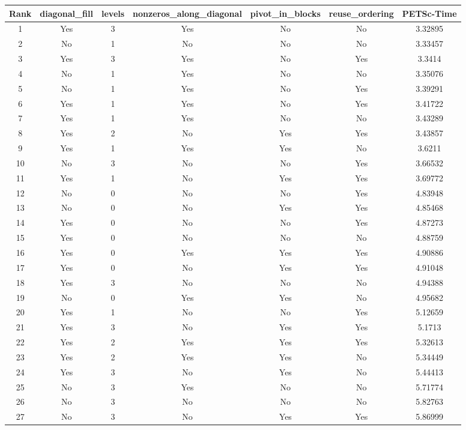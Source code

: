 \begin{table}[h]
  \tiny
  \centering
  \begin{tabular}{ccccccc}
    \hline Rank &  diagonal\_fill & levels & nonzeros\_along\_diagonal & pivot\_in\_blocks & reuse\_ordering  & PETSc-Time\\ \hline
    1 & Yes & 3 & Yes & No & No & 3.32895 \\
    2 & No & 1 & No & No & No & 3.33457 \\
    3 & Yes & 3 & Yes & No & Yes & 3.3414 \\
    4 & No & 1 & Yes & No & No & 3.35076 \\
    5 & No & 1 & Yes & No & Yes & 3.39291 \\
    6 & Yes & 1 & Yes & No & Yes & 3.41722 \\
    7 & Yes & 1 & Yes & No & No & 3.43289 \\
    8 & Yes & 2 & No & Yes & Yes & 3.43857 \\
    9 & Yes & 1 & Yes & Yes & No & 3.6211 \\
    10 & No & 3 & No & No & Yes & 3.66532 \\
    11 & Yes & 1 & No & Yes & Yes & 3.69772 \\
    12 & No & 0 & No & No & Yes & 4.83948 \\
    13 & No & 0 & No & Yes & Yes & 4.85468 \\
    14 & Yes & 0 & No & No & Yes & 4.87273 \\
    15 & Yes & 0 & No & No & No & 4.88759 \\
    16 & Yes & 0 & Yes & Yes & Yes & 4.90886 \\
    17 & Yes & 0 & No & Yes & Yes & 4.91048 \\
    18 & Yes & 3 & No & No & No & 4.94388 \\
    19 & No & 0 & Yes & Yes & No & 4.95682 \\
    20 & Yes & 1 & No & No & Yes & 5.12659 \\
    21 & Yes & 3 & No & Yes & Yes & 5.1713 \\
    22 & Yes & 2 & Yes & Yes & Yes & 5.32613 \\
    23 & Yes & 2 & Yes & Yes & No & 5.34449 \\
    24 & Yes & 3 & No & Yes & No & 5.44413 \\
    25 & No & 3 & Yes & No & No & 5.71774 \\
    26 & No & 3 & No & No & No & 5.82763 \\
    27 & No & 3 & No & Yes & Yes & 5.86999 \\

\end{tabular}
\end{table}
